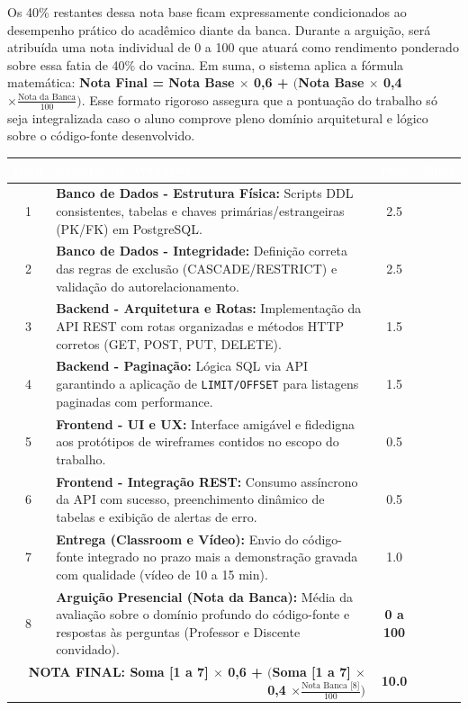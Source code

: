 \documentclass[12pt,a4paper]{article}
\begin{document}
Os 40\% restantes dessa nota base ficam expressamente condicionados ao desempenho prático do acadêmico diante da banca. Durante a arguição, será atribuída uma nota individual de 0 a 100 que atuará como rendimento ponderado sobre essa fatia de 40\% do vacina. Em suma, o sistema aplica a fórmula matemática: \textbf{Nota Final = Nota Base $\times$ 0,6 + $\Big($Nota Base $\times$ 0,4 $\times \frac{\text{Nota da Banca}}{100}\Big)$}. Esse formato rigoroso assegura que a pontuação do trabalho só seja integralizada caso o aluno comprove pleno domínio arquitetural e lógico sobre o código-fonte desenvolvido.
\vspace{0.5cm}

\begin{center}
    
    \renewcommand{\arraystretch}{1.5}
    \begin{tabularx}{\textwidth}{|c|X|c|c|}
        \hline
        \rowcolor{forestgreen}\textcolor{white}{\textbf{Item}} & \textcolor{white}{\textbf{Critério de Avaliação}} & \textcolor{white}{\textbf{Peso}} & \textcolor{white}{\textbf{Nota}} \\
        \hline
        1 & \textbf{Banco de Dados - Estrutura Física:} Scripts DDL consistentes, tabelas e chaves primárias/estrangeiras (PK/FK) em PostgreSQL. & 2.5 & \\
        \hline
        2 & \textbf{Banco de Dados - Integridade:} Definição correta das regras de exclusão (CASCADE/RESTRICT) e validação do autorelacionamento. & 2.5 & \\
        \hline
        3 & \textbf{Backend - Arquitetura e Rotas:} Implementação da API REST com rotas organizadas e métodos HTTP corretos (GET, POST, PUT, DELETE). & 1.5 & \\
        \hline
        4 & \textbf{Backend - Paginação:} Lógica SQL via API garantindo a aplicação de \texttt{LIMIT/OFFSET} para listagens paginadas com performance. & 1.5 & \\
        \hline
        5 & \textbf{Frontend - UI e UX:} Interface amigável e fidedigna aos protótipos de wireframes contidos no escopo do trabalho. & 0.5 & \\
        \hline
        6 & \textbf{Frontend - Integração REST:} Consumo assíncrono da API com sucesso, preenchimento dinâmico de tabelas e exibição de alertas de erro. & 0.5 & \\
        \hline
        7 & \textbf{Entrega (Classroom e Vídeo):} Envio do código-fonte integrado no prazo mais a demonstração gravada com qualidade (vídeo de 10 a 15 min). & 1.0 & \\
        \hline
        \rowcolor{gray!10}
        8 & \textbf{Arguição Presencial (Nota da Banca):} Média da avaliação sobre o domínio profundo do código-fonte e respostas às perguntas (Professor e Discente convidado). & \textbf{0 a 100} & \\
        \hline
        \multicolumn{2}{|r|}{\textbf{NOTA FINAL: Soma [1 a 7] $\times$ 0,6 + $\Big($Soma [1 a 7] $\times$ 0,4 $\times \frac{\text{Nota Banca [8]}}{100}\Big)$}} & \textbf{10.0} & \\
        \hline
    \end{tabularx}
\end{center}
\end{document}
